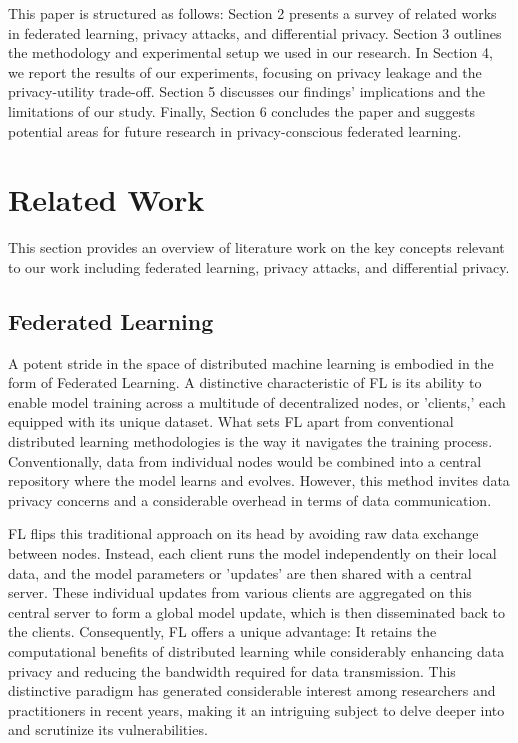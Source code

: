 This paper is structured as follows: Section 2 presents a survey of related works in federated learning, privacy attacks, and differential privacy. Section 3 outlines the methodology and experimental setup we used in our research. In Section 4, we report the results of our experiments, focusing on privacy leakage and the privacy-utility trade-off. Section 5 discusses our findings' implications and the limitations of our study. Finally, Section 6 concludes the paper and suggests potential areas for future research in privacy-conscious federated learning.

\section{Related Work}
This section provides an overview of literature work on the key concepts relevant to our work including federated learning, privacy attacks, and differential privacy. 

\subsection{Federated Learning}

A potent stride in the space of distributed machine learning is embodied in the form of Federated Learning. A distinctive characteristic of FL is its ability to enable model training across a multitude of decentralized nodes, or 'clients,' each equipped with its unique dataset. What sets FL apart from conventional distributed learning methodologies is the way it navigates the training process. Conventionally, data from individual nodes would be combined into a central repository where the model learns and evolves. However, this method invites data privacy concerns and a considerable overhead in terms of data communication.

FL flips this traditional approach on its head by avoiding raw data exchange between nodes. Instead, each client runs the model independently on their local data, and the model parameters or 'updates' are then shared with a central server. These individual updates from various clients are aggregated on this central server to form a global model update, which is then disseminated back to the clients. Consequently, FL offers a unique advantage: It retains the computational benefits of distributed learning while considerably enhancing data privacy and reducing the bandwidth required for data transmission. This distinctive paradigm has generated considerable interest among researchers and practitioners in recent years, making it an intriguing subject to delve deeper into and scrutinize its vulnerabilities.

